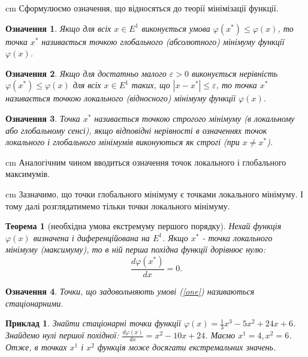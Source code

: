 \documentclass[12pt,a4paper]{article}
\newtheorem{law}{Означення}\newtheorem{law1}[law]{Означення}\newtheorem{law2}[law]{Означення}\newtheorem{law3}[law]{Означення}
\newtheorem{theorem}{Теорема}\newtheorem{theorem1}[theorem]{Теорема}\newtheorem{theorem2}[theorem]{Теорема}\newtheorem{theorem3}[theorem]{Теорема}\newtheorem{theorem4}[theorem]{Теорема}
\newtheorem{example}{Приклад}\newtheorem{example1}[example]{Приклад}\newtheorem{example2}[example]{Приклад}
\begin{document}
\begin{flushleft}
\parbox{14,5 cm}{ cm Сформулюємо означення, що відносяться до теорії мінімізації функції.}
\end{flushleft}
\begin{law}
Якщо для всіх $x\in{E}^1$ виконується умова $\varphi\left({x}^*\right)\le\varphi\left(x\right)$, то точка ${x}^*$ називається точкою глобального (абсолютного) мінімуму функції $\varphi\left(x\right)$.
\end{law}
\begin{law1}
Якщо для достатньо малого $\varepsilon > 0$ виконується нерівність $\varphi\left({x}^*\right)\le\varphi\left(x\right)$ для всіх $x\in {E}^1$ таких, що $\left|x-{x}^*\right|\le\varepsilon$, то точка ${x}^*$ називається точкою локального (відносного) мінімуму функції $\varphi\left(x\right)$.
\end{law1}
\begin{law2}
Точка ${x}^*$ називається точкою строгого мінімуму (в локальному або глобальному сенсі), якщо відповідні нерівності в означеннях точок локального і глобального мінімумів виконуються як строгі (при $x \neq {x}^*$). 
\end{law2}
\begin{flushleft}
\parbox{14,5 cm}{ cm Аналогічним чином вводиться означення точок локального і глобального максимумів.}
\end{flushleft}
\begin{flushleft}
\parbox{14,5 cm}{ cm  Зазначимо, що точки глобального мінімуму є точками локального мінімуму. І тому далі розглядатимемо тільки точки локального мінімуму.}
\end{flushleft}
\begin{theorem}[необхідна умова екстремуму першого порядку]
Нехай функція $\varphi\left(x\right)$ визначена і диференційована на ${E}^1$. Якщо ${x}^*$ - точка локального мінімуму (максимуму), то в ній перша похідна функції дорівнює нулю: 
\begin{equation}\label{one}
\frac{d\varphi\left({x}^*\right)}{dx}=0.
\end{equation}
\end{theorem}
\begin{law3}
Точки, що задовольняють умові (\ref{one}) називаються стаціонарними.
\end{law3}
\begin{example}
Знайти стаціонарні точки функції $\varphi\left(x\right) = \frac{1}{3}{x}^3 - 5{x}^2+24x + 6$.
Знайдемо нулі першої похідної: $\frac{d\varphi\left(x\right)}{dx} = {x}^2 - 10x+24$. Маємо ${x}^1 = 4, {x}^2 = 6$. Отже, в точках ${x}^1$ і ${x}^2$ функція може досягати екстремальних значень.
\end{example}
\end{document}
